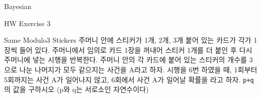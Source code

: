 \begin{edXchapter}{Bayesian}
\begin{edXsection}{HW Exercise 3}
\begin{edXvertical}
\begin{edXproblem}{Same Modulo3 Stickers}
주머니 안에 스티커가 1개, 2개, 3개 붙어 있는 카드가 각가 1장씩 들어 있다. 주머니에서 임의로
카드 1장을 꺼내어 스티커 1개를 더 붙인 후 다시 주머니에 넣는 시행을 반복한다. 주머니 안의
각 카드에 붙어 있는 스티커의 개수를 3으로 나눈 나머지가 모두 같으지는 사건을 A라고 하자.
시행을 6번 하였을 때, 1회부터 5회까지는 사건 A가 일어나지 않고, 6회에서 사건 A가 일어날 
확률을 {\tt\LARGE{}}라고 하자. {\tt\LARGE p+q}의 값을 구하시오 (p와 q는 서로소인 자연수이다)
\end{edXproblem}

\end{edXvertical}
\end{edXsection}
\end{edXchapter}
